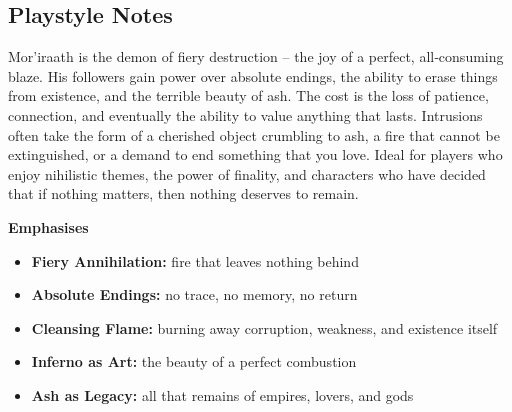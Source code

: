 \subsection*{Playstyle Notes}
Mor'iraath is the demon of fiery destruction – the joy of a perfect, all‑consuming blaze. His followers gain power over absolute endings, the ability to erase things from existence, and the terrible beauty of ash. The cost is the loss of patience, connection, and eventually the ability to value anything that lasts. Intrusions often take the form of a cherished object crumbling to ash, a fire that cannot be extinguished, or a demand to end something that you love. Ideal for players who enjoy nihilistic themes, the power of finality, and characters who have decided that if nothing matters, then nothing deserves to remain.

\noindent\textbf{Emphasises}
\begin{itemize}
  \item \textbf{Fiery Annihilation:} fire that leaves nothing behind
  \item \textbf{Absolute Endings:} no trace, no memory, no return
  \item \textbf{Cleansing Flame:} burning away corruption, weakness, and existence itself
  \item \textbf{Inferno as Art:} the beauty of a perfect combustion
  \item \textbf{Ash as Legacy:} all that remains of empires, lovers, and gods
\end{itemize}